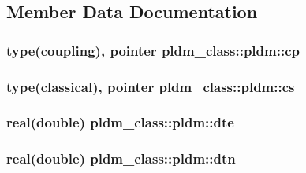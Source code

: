 \subsection{Member Data Documentation}
\hypertarget{structpldm__class_1_1pldm_a029ca44825538a8806a9383f1b04914e}{
\subsubsection[{cp}]{\setlength{\rightskip}{0pt plus 5cm}type(coupling), pointer pldm\-\_\-class\-::pldm\-::cp\hspace{0.3cm}{\ttfamily [private]}}}\label{structpldm__class_1_1pldm_a029ca44825538a8806a9383f1b04914e}
\hypertarget{structpldm__class_1_1pldm_a2366c673bb4049d423c1605f801c49ab}{
\subsubsection[{cs}]{\setlength{\rightskip}{0pt plus 5cm}type(classical), pointer pldm\-\_\-class\-::pldm\-::cs\hspace{0.3cm}{\ttfamily [private]}}}\label{structpldm__class_1_1pldm_a2366c673bb4049d423c1605f801c49ab}
\hypertarget{structpldm__class_1_1pldm_a59460330dd0feba03a287ac14711d9a8}{
\subsubsection[{dte}]{\setlength{\rightskip}{0pt plus 5cm}real(double) pldm\-\_\-class\-::pldm\-::dte\hspace{0.3cm}{\ttfamily [private]}}}\label{structpldm__class_1_1pldm_a59460330dd0feba03a287ac14711d9a8}
\hypertarget{structpldm__class_1_1pldm_a03a577c0a1845e2f6b01ab5aacb9bd0f}{
\subsubsection[{dtn}]{\setlength{\rightskip}{0pt plus 5cm}real(double) pldm\-\_\-class\-::pldm\-::dtn\hspace{0.3cm}{\ttfamily [private]}}}\label{structpldm__class_1_1pldm_a03a577c0a1845e2f6b01ab5aacb9bd0f}
